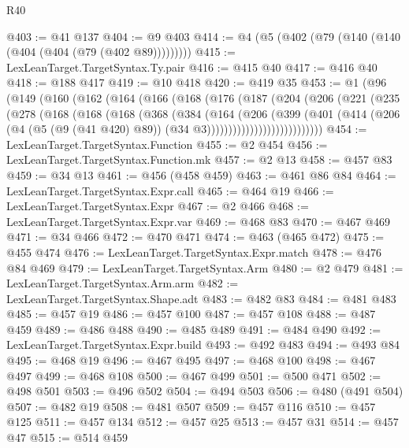 \begin{lexlean}{R40}
\begin{coremodule}
{{{{{{{{{{{{{{{{{{{{{{{{{{{{{{{{{{{{{{{{{{{{{{{{{{{{{{{{{{{{{{{{{{{{{{{{{{{{{{{{{{{{{{{{{{{{{{{{{{{{{{{{{{{{{@403 := @41 @137
@404 := @9 @403
@414 := @4 (@5 (@402 (@79 (@140 (@140 (@404 (@404 (@79 (@402 @89)))))))))
@415 := LexLeanTarget.TargetSyntax.Ty.pair
@416 := @415 @40
@417 := @416 @40
@418 := @188 @417
@419 := @10 @418
@420 := @419 @35
@453 := @1
    (@96
      (@149
        (@160
          (@162
            (@164
              (@166
                (@168
                  (@176
                    (@187
                      (@204
                        (@206
                          (@221
                            (@235
                              (@278
                                (@168
                                  (@168
                                    (@168
                                      (@368
                                        (@384
                                          (@164
                                            (@206
                                              (@399
                                                (@401
                                                  (@414
                                                    (@206
                                                      (@4
                                                        (@5 (@9 (@41 @420) @89))
                                                        (@34 @3)))))))))))))))))))))))))))
@454 := LexLeanTarget.TargetSyntax.Function
@455 := @2 @454
@456 := LexLeanTarget.TargetSyntax.Function.mk
@457 := @2 @13
@458 := @457 @83
@459 := @34 @13
@461 := @456 (@458 @459)
@463 := @461 @86 @84
@464 := LexLeanTarget.TargetSyntax.Expr.call
@465 := @464 @19
@466 := LexLeanTarget.TargetSyntax.Expr
@467 := @2 @466
@468 := LexLeanTarget.TargetSyntax.Expr.var
@469 := @468 @83
@470 := @467 @469
@471 := @34 @466
@472 := @470 @471
@474 := @463 (@465 @472)
@475 := @455 @474
@476 := LexLeanTarget.TargetSyntax.Expr.match
@478 := @476 @84 @469
@479 := LexLeanTarget.TargetSyntax.Arm
@480 := @2 @479
@481 := LexLeanTarget.TargetSyntax.Arm.arm
@482 := LexLeanTarget.TargetSyntax.Shape.adt
@483 := @482 @83
@484 := @481 @483
@485 := @457 @19
@486 := @457 @100
@487 := @457 @108
@488 := @487 @459
@489 := @486 @488
@490 := @485 @489
@491 := @484 @490
@492 := LexLeanTarget.TargetSyntax.Expr.build
@493 := @492 @483
@494 := @493 @84
@495 := @468 @19
@496 := @467 @495
@497 := @468 @100
@498 := @467 @497
@499 := @468 @108
@500 := @467 @499
@501 := @500 @471
@502 := @498 @501
@503 := @496 @502
@504 := @494 @503
@506 := @480 (@491 @504)
@507 := @482 @19
@508 := @481 @507
@509 := @457 @116
@510 := @457 @125
@511 := @457 @134
@512 := @457 @25
@513 := @457 @31
@514 := @457 @47
@515 := @514 @459
}}}}}}}}}}}}}}}}}}}}}}}}}}}}}}}}}}}}}}}}}}}}}}}}}}}}}}}}}}}}}}}}}}}}}}}}}}}}}}}}}}}}}}}}}}}}}}}}}}}}}}}}}}}}}
\end{coremodule}
\end{lexlean}
